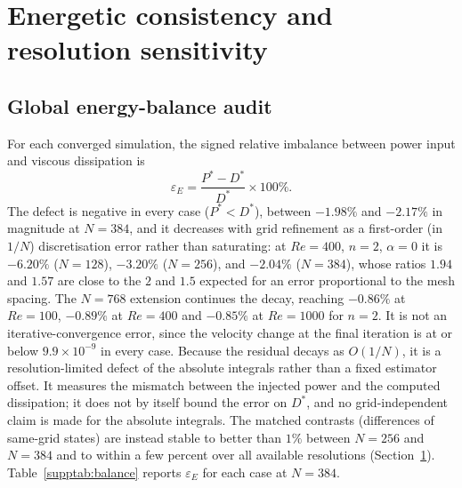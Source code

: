 \section{Energetic consistency and resolution sensitivity}
\label{suppsec:consistency}

\subsection{Global energy-balance audit}

For each converged simulation, the signed relative imbalance between power input and viscous dissipation is
\begin{equation}
\varepsilon_E = \frac{P^*-D^*}{D^*}\times 100\%.
\end{equation}
The defect is negative in every case ($P^*<D^*$), between $-1.98\%$ and $-2.17\%$ in magnitude at $N=384$, and it decreases with grid refinement as a first-order (in $1/N$) discretisation error rather than saturating: at $Re=400$, $n=2$, $\alpha=0$ it is $-6.20\%$ ($N=128$), $-3.20\%$ ($N=256$), and $-2.04\%$ ($N=384$), whose ratios $1.94$ and $1.57$ are close to the $2$ and $1.5$ expected for an error proportional to the mesh spacing. The $N=768$ extension continues the decay, reaching $-0.86\%$ at $Re=100$, $-0.89\%$ at $Re=400$ and $-0.85\%$ at $Re=1000$ for $n=2$. It is not an iterative-convergence error, since the velocity change at the final iteration is at or below $9.9\times10^{-9}$ in every case. Because the residual decays as $O(1/N)$, it is a resolution-limited defect of the absolute integrals rather than a fixed estimator offset. It measures the mismatch between the injected power and the computed dissipation; it does not by itself bound the error on $D^*$, and no grid-independent claim is made for the absolute integrals. The matched contrasts (differences of same-grid states) are instead stable to better than $1\%$ between $N=256$ and $N=384$ and to within a few percent over all available resolutions (Section~\ref{suppsec:consistency}). Table~\ref{supptab:balance} reports $\varepsilon_E$ for each case at $N=384$.

